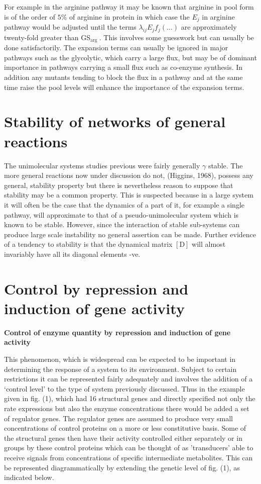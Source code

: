 For example in the arginine pathway it may be known that arginine in pool form is of the order of $5 \%$ of arginine in protein in which case the ${E}_{j}$ in arginine pathway would be adjusted until the terms $\lambda_{i j} E_{j} f_{j}(\ldots)$ are approximately twenty-fold greater than GS$_{\text {arg }}$. This involves some guesswork but can usually be done satisfactorily. The expansion terms can usually be ignored in major pathways such as the glycolytic, which carry a large flux, but may be of dominant importance in pathways carrying a small flux such as co-enzyme synthesis. In addition any mutants tending to block the flux in a pathway and at the same time raise the pool levels will enhance the importance of the expansion terms.

\section{Stability of networks of general reactions}

The unimolecular systems studies previous were fairly generally $\gamma$ stable. The more general reactions now under discussion do not, (Higgins, 1968), possess any general, stability property but there is nevertheless reason to suppose that stability may be a common property. This is suspected because in a large system it will often be the case that the dynamics of a part of it, for example a single pathway, will approximate to that of a pseudo-unimolecular system which is known to be stable. However, since the interaction of stable sub-systems can produce large scale instability no general assertion can be made. Further evidence of a tendency to stability is that the dynamical matrix $[\mathrm{D}]$ will almost invariably have all its diagonal elements -ve.

\section{Control by repression and induction of gene activity}

{\bf Control of enzyme quantity by repression and induction of gene activity}

This phenomenon, which is widespread can be expected to be important in determining the response of a system to its environment. Subject to certain restrictions it can be represented fairly adequately and involves the addition of a `control level' to the type of system previously discussed. Thus in the example given in fig. (1), which had 16 structural genes and directly specified not only the rate expressions but also the enzyme concentrations there would be added a set of regulator genes. The regulator genes are assumed to produce very small concentrations of control proteins on a more or less constitutive basis. Some of the structural genes then have their activity controlled either separately or in groups by these control proteins which can be thought of as 'transducers' able to receive signals from concentrations of specific intermediate metabolites. This can be represented diagrammatically by extending the genetic level of fig. (1), as indicated below.

